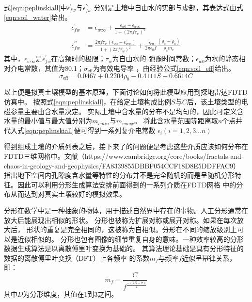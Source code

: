 式\ref{eqn:peplinskiall}中$\epsilon_{f w}^{\prime}$与$\epsilon_{f w}^{\prime \prime}$
分别是土壤中自由水的实部与虚部，其表达式由式\ref{eqn:soil_water}给出。
\begin{equation} 
	\label{eqn:soil_water}
	\begin{aligned}
		\epsilon_{f w}^{\prime}&=\epsilon_{w \infty}+\frac{\epsilon_{w 0}-\epsilon_{w \infty}}{1+\left(2 \pi f \tau_{w}\right)^{2}} \\
		\epsilon_{f w}^{\prime \prime}&=\frac{2 \pi f \tau_{w}\left(\epsilon_{w 0}-\epsilon_{w \infty}\right)}{1+\left(2 \pi f \tau_{w}\right)^{2}}+\frac{\sigma_{\mathrm{eff}}}{2 \pi \epsilon_{0} f} \frac{\left(\rho_{s}-\rho_{b}\right)}{\rho_{s} m_{v}}
	\end{aligned}
\end{equation}
其中，$\epsilon_{w \infty}$是$\epsilon_{f w}^{\prime}$在高频时的极限；$\tau_{w}$为自由水的
弛豫时间常数；$\epsilon_{w 0}$为水的静态相对介电常数，其值为80.1；$\sigma_{\mathrm{eff}}$为有效电导率
，由经验公式\ref{eqn:soil_eff}给出。
\begin{equation}
	\label{eqn:soil_eff}
\sigma_{\mathrm{eff}}=0.0467+0.2204 \rho_{b}-0.4111 S+0.6614 C
\end{equation}

以上便是拟真土壤模型的基本原理，下面讨论如何将此模型应用到探地雷达FDTD仿真中。
按照式\ref{eqn:peplinskiall}，在给定土壤构成比例$S$与$C$后，该土壤类型的电磁参量主要由含水量决定。
实际土壤中含水量的分布不是均匀的，因此可定义含水量的最小值与最大值分别为$m_{vmin}$与$m_{vmax}$。
将此含水量范围等距离取$n$个点并代入式\ref{eqn:peplinskiall}便可得到一系列复介电常数
$\epsilon_i(i=1,2,3...n)$ 

得到组成土壤的介质列表之后，接下来了的问题便是考虑这些介质应该如何分布在FDTD三维网格中。文献（https://www.cambridge.org/core/books/fractals-and-chaos-in-geology-and-geophysics/FA8339855DBBF054CCF18D8E5DDFFAC9）
指出地下空间内孔隙度含水量等特性的分布并不是完全随机的而是呈随机分形特征。因此可以利用分形生成算法安排前面得到的一系列介质在FDTD网格
中的分布从而达到对真实土壤较好的模拟效果。

分形在数学中是一种抽象的物体，用于描述自然界中存在的事物。人工分形通常在放大后能展现出相似的形状。 
分形也被称为扩展对称或展开对称。如果在每次放大后，
形状的重复是完全相同的，这被称为自相似。分形在不同的缩放级别上可以是近似相似的。 
分形也包有图像的细节重复自身的意味。一种效率较高的分形数据生成算法是以离散傅里叶变换为基础的。
其算法理论基础是具有分形特征的数据的离散傅里叶变换（DFT）上各频率
的系数$m_f$与频率$f$近似呈幂律关系，即：
\begin{equation}
m_f = \frac{C}{f^{\frac{-(2 D-7)}{2}}}
\end{equation}
其中$D$为分形维度，其值在1到3之间。

